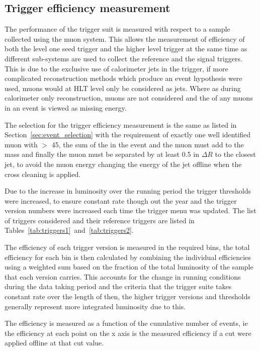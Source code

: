\subsection{Trigger efficiency measurement} %
\label{sub:trigger_efficiency_measurement}

The performance of the \alt trigger suit is measured with respect to a sample 
collected using the muon system. This allows the measurement of efficiency of 
both the level one seed trigger and the higher level trigger at the same time 
as different sub-systems are used to collect the reference and the signal 
triggers. This is due to the exclusive use of calorimeter jets in the \alt 
trigger, if more complicated reconstruction methods which produce an event 
hypothesis were used, muons would at HLT level only be considered as jets. 
Where as during calorimeter only reconstruction, muons are not considered and 
the \pt of any muons in an event is viewed as missing energy.

The selection for the trigger efficiency measurement is the same as listed in 
Section~\ref{sec:event_selection} with the requirement of exactly one well 
identified muon with \PT $>$ \unit{45}{\GeV}, the sum of the \MET in the event 
and the muon must add to the \PW mass and finally the muon must be separated by 
at least 0.5 in $\Delta R$ to the closest jet, to avoid the muon energy 
changing the energy of the jet offline when the cross cleaning is applied.

Due to the increase in luminosity over the running period the trigger 
thresholds were increased, to ensure constant rate though out the year and the 
trigger version numbers were increased each time the trigger menu was updated.
The list of triggers considered and their reference triggers are listed in 
Tables~\ref{tab:triggers1}~and~\ref{tab:triggers2}.

The efficiency of each trigger version is measured in the required \HT bins, 
the total efficiency for each \HT bin is then calculated by combining the 
individual efficiencies using a weighted sum based on the fraction of 
the total luminosity of the sample that each version carries. This accounts for 
the change in running conditions during the data taking period and the criteria 
that the trigger suite takes constant rate over the length of then, the higher 
trigger versions and thresholds generally represent more integrated luminosity 
due to this.

The efficiency is measured as a function of the cumulative number of events, ie the efficiency at each point on the x axis is the measured efficiency if a cut were applied offline at that cut value.




